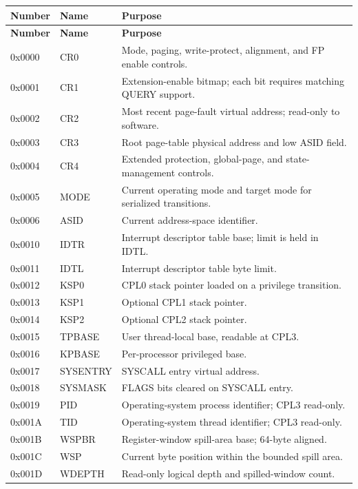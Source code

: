 \documentclass[11pt]{article}
\begin{document}
\begin{longtable}{@{}L{1.7cm}L{2.8cm}L{7.4cm}@{}}
\toprule
\textbf{Number} & \textbf{Name} & \textbf{Purpose} \\ \midrule
\endfirsthead
\toprule
\textbf{Number} & \textbf{Name} & \textbf{Purpose} \\ \midrule
\endhead
0x0000 & CR0 & Mode, paging, write-protect, alignment, and FP enable controls. \\
0x0001 & CR1 & Extension-enable bitmap; each bit requires matching QUERY support. \\
0x0002 & CR2 & Most recent page-fault virtual address; read-only to software. \\
0x0003 & CR3 & Root page-table physical address and low ASID field. \\
0x0004 & CR4 & Extended protection, global-page, and state-management controls. \\
0x0005 & MODE & Current operating mode and target mode for serialized transitions. \\
0x0006 & ASID & Current address-space identifier. \\
0x0010 & IDTR & Interrupt descriptor table base; limit is held in IDTL. \\
0x0011 & IDTL & Interrupt descriptor table byte limit. \\
0x0012 & KSP0 & CPL0 stack pointer loaded on a privilege transition. \\
0x0013 & KSP1 & Optional CPL1 stack pointer. \\
0x0014 & KSP2 & Optional CPL2 stack pointer. \\
0x0015 & TPBASE & User thread-local base, readable at CPL3. \\
0x0016 & KPBASE & Per-processor privileged base. \\
0x0017 & SYSENTRY & SYSCALL entry virtual address. \\
0x0018 & SYSMASK & FLAGS bits cleared on SYSCALL entry. \\
0x0019 & PID & Operating-system process identifier; CPL3 read-only. \\
0x001A & TID & Operating-system thread identifier; CPL3 read-only. \\
0x001B & WSPBR & Register-window spill-area base; 64-byte aligned. \\
0x001C & WSP & Current byte position within the bounded spill area. \\
0x001D & WDEPTH & Read-only logical depth and spilled-window count. \\

\end{longtable}
\end{document}
